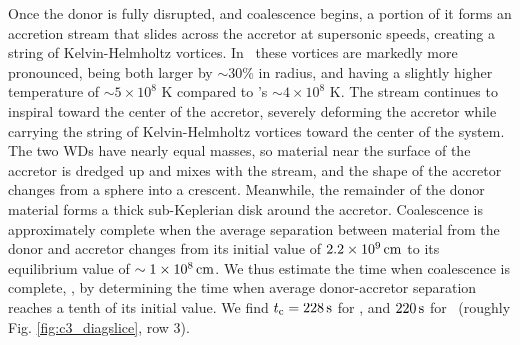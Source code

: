 
Once the donor is fully disrupted, and coalescence begins, a portion of it forms an accretion stream that slides across the accretor at supersonic speeds, creating a string of Kelvin-Helmholtz vortices.  In \arepo\ these vortices are markedly more pronounced, being both larger by $\sim30$\% in radius, and having a slightly higher temperature of $\sim5\times10^8$ K compared to \gasoline's $\sim4\times10^8$ K.  The stream continues to inspiral toward the center of the accretor, severely deforming the accretor while carrying the string of Kelvin-Helmholtz vortices toward the center of the system.  The two WDs have nearly equal masses, so material near the surface of the accretor is dredged up and mixes with the stream, and the shape of the accretor changes from a sphere into a crescent.  Meanwhile, the remainder of the donor material forms a thick sub-Keplerian disk around the accretor.  Coalescence is approximately complete when the average separation between material from the donor and accretor changes from its initial value of $2.2\times10^9\,\mathrm{cm}$ to its equilibrium value of $\sim1\times10^8\,\mathrm{cm}$.  We thus estimate the time when coalescence is complete, \tcoal, by determining the time when average donor-accretor separation reaches a tenth of its initial value.  We find $\tcoal = 228\,\mrm{s}$ for \gasoline, and $220\,\mathrm{s}$ for \arepo\ (roughly Fig. \ref{fig:c3_diagslice}, row 3).

